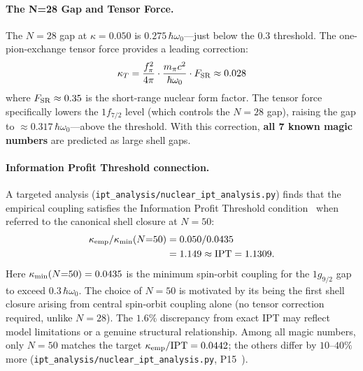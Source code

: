 \documentclass[9pt,twocolumn]{extarticle}
\begin{document}
\paragraph{The N=28 Gap and Tensor Force.}
The $N = 28$ gap at $\kappa = 0.050$ is $0.275\,\hbar\omega_0$---just below the 0.3 threshold. The one-pion-exchange tensor force provides a leading correction:
\[
\kappa_T = \frac{f_\pi^2}{4\pi}\cdot\frac{m_\pi c^2}{\hbar\omega_0}\cdot F_{\rm SR} \approx 0.028
\]
where $F_{\rm SR} \approx 0.35$ is the short-range nuclear form factor. The tensor force specifically lowers the $1f_{7/2}$ level (which controls the $N = 28$ gap), raising the gap to $\approx 0.317\,\hbar\omega_0$---above the threshold. With this correction, \textbf{all 7 known magic numbers} are predicted as large shell gaps.

\paragraph{Information Profit Threshold connection.}
A targeted analysis (\texttt{ipt\_analysis/nuclear\_ipt\_analysis.py}) finds that the
empirical coupling satisfies the Information Profit Threshold condition~\cite{SpivackIPT}
when referred to the canonical shell closure at $N = 50$:
\begin{align*}
  \kappa_{\rm emp} / \kappa_{\rm min}(N{=}50)
    &= 0.050/0.0435 \\
    &= 1.149 \approx \mathrm{IPT} = 1.1309.
\end{align*}
Here $\kappa_{\rm min}(N{=}50) = 0.0435$ is the minimum spin-orbit coupling for the
$1g_{9/2}$ gap to exceed $0.3\,\hbar\omega_0$. The choice of $N = 50$ is motivated by
its being the first shell closure arising from central spin-orbit coupling alone (no
tensor correction required, unlike $N = 28$). The $1.6\%$ discrepancy from exact IPT
may reflect model limitations or a genuine structural relationship.  Among all magic
numbers, only $N = 50$ matches the target $\kappa_{\rm emp}/\mathrm{IPT} = 0.0442$;
the others differ by $10$--$40\%$ more (\texttt{ipt\_analysis/nuclear\_ipt\_analysis.py},
P15~\cite{SpivackIPT}).
\end{document}
